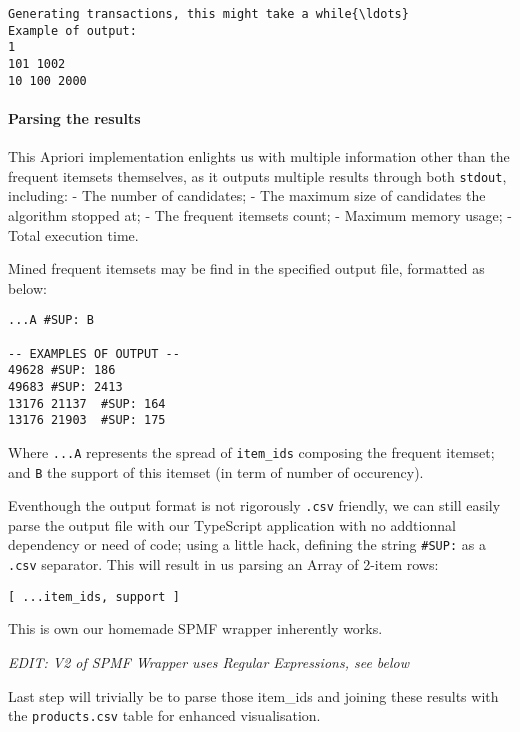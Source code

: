 \documentclass[11pt]{article}
\begin{document}
    \begin{Verbatim}[commandchars=\\\{\}]
Generating transactions, this might take a while{\ldots}
Example of output:
1
101 1002
10 100 2000

    \end{Verbatim}

    \hypertarget{parsing-the-results}{%
\paragraph{Parsing the results}\label{parsing-the-results}}

This Apriori implementation enlights us with multiple information other
than the frequent itemsets themselves, as it outputs multiple results
through both \texttt{stdout}, including: - The number of candidates; -
The maximum size of candidates the algorithm stopped at; - The frequent
itemsets count; - Maximum memory usage; - Total execution time.

Mined frequent itemsets may be find in the specified output file,
formatted as below:

\begin{verbatim}
...A #SUP: B

-- EXAMPLES OF OUTPUT --
49628 #SUP: 186
49683 #SUP: 2413
13176 21137  #SUP: 164
13176 21903  #SUP: 175
\end{verbatim}

Where \texttt{...A} represents the spread of \texttt{item\_ids}
composing the frequent itemset; and \texttt{B} the support of this
itemset (in term of number of occurency).

Eventhough the output format is not rigorously \texttt{.csv} friendly,
we can still easily parse the output file with our TypeScript
application with no addtionnal dependency or need of code; using a
little hack, defining the string \texttt{\#SUP:} as a \texttt{.csv}
separator. This will result in us parsing an Array of 2-item rows:

\begin{verbatim}
[ ...item_ids, support ]
\end{verbatim}

This is own our homemade SPMF wrapper inherently works.

\emph{EDIT: V2 of SPMF Wrapper uses Regular Expressions, see below}

Last step will trivially be to parse those item\_ids and joining these
results with the \texttt{products.csv} table for enhanced visualisation.
\end{document}
